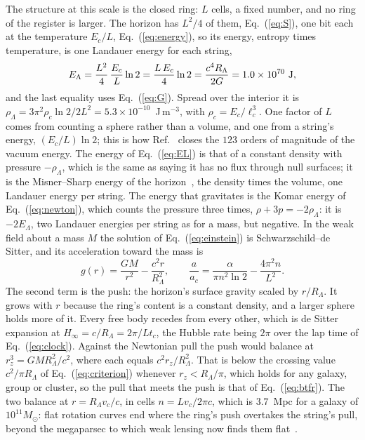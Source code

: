 \documentclass[aps,prd,twocolumn,superscriptaddress,nofootinbib,showkeys]{revtex4-2}
\newcommand{\lc}{\ell_c}
\newcommand{\tc}{t_c}
\newcommand{\Ec}{E_c}
\newcommand{\ac}{a_c}
\newcommand{\RL}{R_\Lambda}
\begin{document}
The structure at this scale is the closed ring: $L$ cells, a fixed number, and no ring of the register is larger. The horizon has $L^2/4$ of them, Eq.~(\ref{eq:S}), one bit each at the temperature $\Ec/L$, Eq.~(\ref{eq:energy}), so its energy, entropy times temperature, is one Landauer energy for each string,
\begin{equation}
E_\Lambda = \frac{L^2}{4}\,\frac{\Ec}{L}\ln2 = \frac{L\,\Ec}{4}\ln2 = \frac{c^4\RL}{2G} = 1.0\times10^{70}~{\rm J},
\label{eq:EL}
\end{equation}
and the last equality uses Eq.~(\ref{eq:G}). Spread over the interior it is $\rho_\Lambda = 3\pi^2\rho_c\ln2/2L^2 = 5.3\times10^{-10}$~J\,m$^{-3}$, with $\rho_c = \Ec/\lc^3$. One factor of $L$ comes from counting a sphere rather than a volume, and one from a string's energy, $(\Ec/L)\ln2$; this is how Ref.~\cite{korytko2026b} closes the $123$ orders of magnitude of the vacuum energy. The energy of Eq.~(\ref{eq:EL}) is that of a constant density with pressure $-\rho_\Lambda$, which is the same as saying it has no flux through null surfaces; it is the Misner--Sharp energy of the horizon~\cite{misner1964}, the density times the volume, one Landauer energy per string. The energy that gravitates is the Komar energy of Eq.~(\ref{eq:newton}), which counts the pressure three times, $\rho + 3p = -2\rho_\Lambda$: it is $-2E_\Lambda$, two Landauer energies per string as for a mass, but negative. In the weak field about a mass $M$ the solution of Eq.~(\ref{eq:einstein}) is Schwarzschild--de Sitter, and its acceleration toward the mass is
\begin{equation}
g(r) = \frac{GM}{r^2} - \frac{c^2 r}{\RL^2}, \qquad \frac{a}{\ac} = \frac{\alpha}{\pi n^2\ln2} - \frac{4\pi^2 n}{L^2} .
\label{eq:push}
\end{equation}
The second term is the push: the horizon's surface gravity scaled by $r/\RL$. It grows with $r$ because the ring's content is a constant density, and a larger sphere holds more of it. Every free body recedes from every other, which is de Sitter expansion at $H_\infty = c/\RL = 2\pi/L\tc$, the Hubble rate being $2\pi$ over the lap time of Eq.~(\ref{eq:clock}). Against the Newtonian pull the push would balance at $r_z^3 = GM\RL^2/c^2$, where each equals $c^2r_z/\RL^2$. That is below the crossing value $c^2/\pi\RL$ of Eq.~(\ref{eq:criterion}) whenever $r_z < \RL/\pi$, which holds for any galaxy, group or cluster, so the pull that meets the push is that of Eq.~(\ref{eq:btfr}). The two balance at $r = \RL v_c/c$, in cells $n = Lv_c/2\pi c$, which is $3.7$~Mpc for a galaxy of $10^{11}M_\odot$: flat rotation curves end where the ring's push overtakes the string's pull, beyond the megaparsec to which weak lensing now finds them flat~\cite{mistele2024}.
\end{document}
